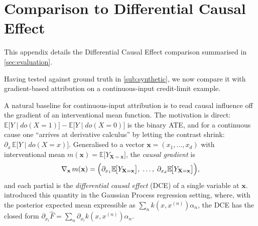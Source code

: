 \section{Comparison to Differential Causal Effect}\label{sec:DCE}

This appendix details the Differential Causal Effect comparison summarised in \cref{sec:evaluation}.

Having tested \ourapproach against ground truth in
\cref{sub:synthetic}, we now compare it with gradient-based
attribution on a continuous-input credit-limit example.

A natural baseline for continuous-input attribution is to read causal influence off
the gradient of an interventional mean function. The motivation is direct:
$\mathbb{E}\!\bigl[Y\mid do(X{=}1)\bigr]-\mathbb{E}\!\bigl[Y\mid do(X{=}0)\bigr]$
is the binary ATE, and for a continuous cause one ``arrives at derivative
calculus'' \citep[Section~7.4.3]{ness2025causal} by letting the contrast shrink:
$\partial_x\,\mathbb{E}\!\bigl[Y\mid do(X{=}x)\bigr]$. Generalised to a vector
$\mathbf{x}=(x_1,\ldots,x_d)$ with interventional mean
$m(\mathbf{x})=\mathbb{E}\!\bigl[Y_{\mathbf{X}=\mathbf{x}}\bigr]$, the
\emph{causal gradient} is
\[
\nabla_{\mathbf{x}}\,m(\mathbf{x})
=\Bigl(\partial_{x_1}\mathbb{E}\!\bigl[Y_{\mathbf{X}=\mathbf{x}}\bigr],\;\ldots,\;
        \partial_{x_d}\mathbb{E}\!\bigl[Y_{\mathbf{X}=\mathbf{x}}\bigr]\Bigr),
\]
and each partial is the \emph{differential causal effect} (DCE) of a single
variable at $\mathbf{x}$. \citet{butler2022differential} introduced this
quantity in the Gaussian Process regression setting, where, with the posterior
expected mean expressible as $\sum_n k(x,x^{(n)})\alpha_n$, the DCE has the
closed form $\partial_{x_i}\hat{F}=\sum_n \partial_{x_i}k(x,x^{(n)})\alpha_n$.

